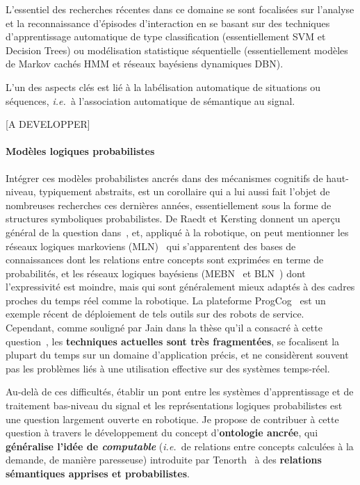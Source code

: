 \documentclass[a4paper]{article}
\newcommand{\ie}{{\textit{i.e.~}}}
\begin{document}
L'essentiel des recherches récentes dans ce domaine se sont focalisées sur
l'analyse et la reconnaissance d'épisodes d'interaction en se basant sur des
techniques d'apprentissage automatique de type classification (essentiellement SVM
et Decision Trees) ou modélisation statistique séquentielle (essentiellement
modèles de Markov cachés HMM et réseaux bayésiens dynamiques DBN).

L'un des aspects clés est lié à la labélisation automatique
de situations ou séquences, \ie à l'association automatique de sémantique au
signal. ~\cite{mihoub2014modeling}

[A DEVELOPPER]

\paragraph{Modèles logiques probabilistes}

Intégrer ces modèles probabilistes ancrés dans des mécanismes cognitifs de
haut-niveau, typiquement abstraits, est un corollaire qui a lui aussi fait
l'objet de nombreuses recherches ces dernières années, essentiellement sous la
forme de structures symboliques probabilistes. De Raedt et Kersting donnent un
aperçu général de la question dans~\cite{deraedt2008probabilistic}, et, appliqué
à la robotique, on peut mentionner les réseaux logiques markoviens
(MLN)~\cite{richardson2006markov} qui s'apparentent des bases de connaissances
dont les relations entre concepts sont exprimées en terme de probabilités, et
les réseaux logiques bayésiens (MEBN~\cite{laskey2008mebn} et
BLN~\cite{jain2009bayesian}) dont l'expressivité est moindre, mais qui sont
généralement mieux adaptés à des cadres proches du temps réel comme la
robotique. La plateforme {\sc ProgCog}~\cite{jain2009equipping} est un exemple
récent de déploiement de tels outils sur des robots de service. Cependant, comme
souligné par Jain dans la thèse qu'il a consacré à cette
question~\cite{jain2012probabilistic}, les \textbf{techniques actuelles sont
très fragmentées}, se focalisent la plupart du temps sur un domaine
d'application précis, et ne considèrent souvent pas les problèmes liés à une
utilisation effective sur des systèmes temps-réel.


Au-delà de ces difficultés, établir un pont entre les systèmes d'apprentissage
et de traitement bas-niveau du signal et les représentations logiques
probabilistes est une question largement ouverte en robotique. Je
propose de contribuer à cette question à travers le développement du concept
d'\textbf{ontologie ancrée}, qui \textbf{généralise l'idée de \emph{computable}}
(\ie de relations entre concepts calculées à la demande, de manière
paresseuse) introduite par Tenorth~\cite{tenorth2009knowrob} à des
\textbf{relations sémantiques apprises et probabilistes}.
\end{document}
